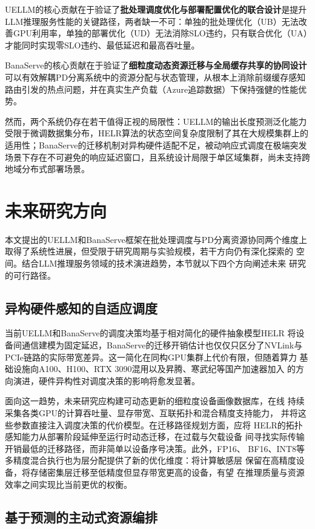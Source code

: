 UELLM的核心贡献在于验证了\textbf{批处理调度优化与部署配置优化的联合设计}是提升LLM推理服务性能的关键路径，两者缺一不可：单独的批处理优化（UB）无法改善GPU利用率，单独的部署优化（UD）无法消除SLO违约，只有联合优化（UA）才能同时实现零SLO违约、最低延迟和最高吞吐量。

BanaServe的核心贡献在于验证了\textbf{细粒度动态资源迁移与全局缓存共享的协同设计}可以有效解耦PD分离系统中的资源分配与状态管理，从根本上消除前缀缓存感知路由引发的热点问题，并在真实生产负载（Azure追踪数据）下保持强健的性能优势。

然而，两个系统仍存在若干值得正视的局限性：UELLM的输出长度预测泛化能力受限于微调数据集分布，HELR算法的状态空间复杂度限制了其在大规模集群上的适用性；BanaServe的迁移机制对异构硬件适配不足，被动响应式调度在极端突发场景下存在不可避免的响应延迟窗口，且系统设计局限于单区域集群，尚未支持跨地域分布式部署场景。

\section{未来研究方向}

本文提出的UELLM和BanaServe框架在批处理调度与PD分离资源协同两个维度上
取得了系统性进展，但受限于研究周期与实验规模，若干方向仍有深化探索的
空间。结合LLM推理服务领域的技术演进趋势，本节就以下四个方向阐述未来
研究的可行路径。

\subsection{异构硬件感知的自适应调度}

当前UELLM和BanaServe的调度决策均基于相对简化的硬件抽象模型HELR
将设备间通信建模为固定延迟，BanaServe的迁移开销估计也仅仅只区分了NVLink与PCIe链路的实际带宽差异。这一简化在同构GPU集群上代价有限，但随着算力
基础设施向A100、H100、RTX 3090混用以及昇腾、寒武纪等国产加速器加入
的方向演进，硬件异构性对调度决策的影响将愈发显著。

面向这一趋势，未来研究应构建可动态更新的细粒度设备画像数据库，在线
持续采集各类GPU的计算吞吐量、显存带宽、互联拓扑和混合精度支持能力，
并将这些参数直接注入调度决策的代价模型。在迁移路径规划方面，应将
HELR的拓扑感知能力从部署阶段延伸至运行时动态迁移，在过载与欠载设备
间寻找实际传输开销最低的迁移路径，而非简单以设备序号决策。此外，FP16、
BF16、INT8等多精度混合执行也为层分配提供了新的优化维度：将计算敏感层
保留在高精度设备，将存储密集层迁移至低精度但显存带宽更高的设备，有望
在推理质量与资源效率之间实现比当前更优的权衡。

\subsection{基于预测的主动式资源编排}

